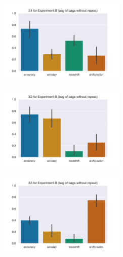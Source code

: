 \documentclass[10pt,letterpaper]{article}
\begin{document}
\begin{figure}[t]
\centering
\captionsetup{justification=centering}

\begin{subfigure}{0.33\textwidth}
\includegraphics[width=0.9\linewidth, height=4cm]{plots/expB_s1.png} 
\label{fig:expB1}
\end{subfigure}
\begin{subfigure}{0.33\textwidth}
\includegraphics[width=0.9\linewidth, height=4cm]{plots/expB_s2.png}
\label{fig:expB2}
\end{subfigure}
\begin{subfigure}{0.33\textwidth}
\includegraphics[width=0.9\linewidth, height=4cm]{plots/expB_s3.png}
\label{fig:expB3}
\end{subfigure}


\end{figure}
\end{document}
